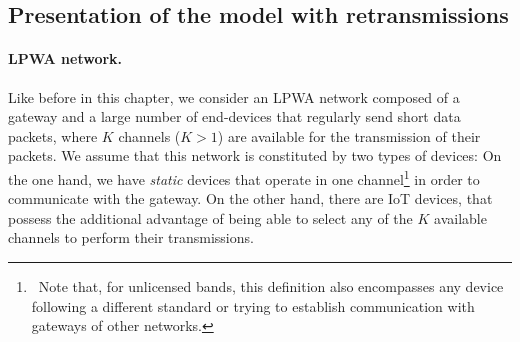 

\subsection{Presentation of the model with retransmissions}
\label{sub:43:model}

\paragraph{LPWA network.}

Like before in this chapter, we consider an LPWA network composed of a gateway and a large number of end-devices that regularly send short data packets, where $K$ channels ($K>1$) are available for the transmission of their packets.
%
We assume that this network is constituted by two types of devices:
On the one hand, we have \emph{static} devices that operate in one channel\footnote{~Note that, for unlicensed bands, this definition also encompasses any device following a different standard or trying to establish communication with gateways of other networks.} in order to communicate with the gateway.
%
On the other hand, there are  IoT devices, that possess the additional advantage of being able to select any of the $K$ available channels to perform their transmissions.

